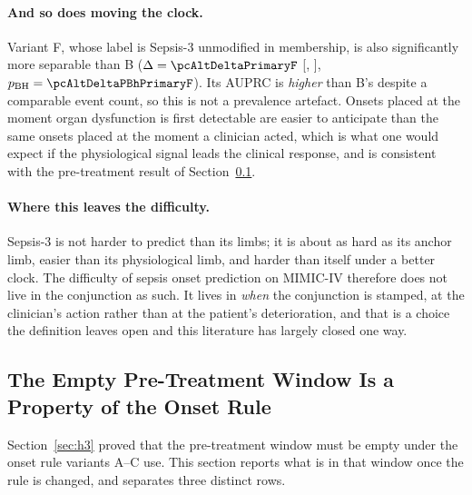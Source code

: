 \paragraph{And so does moving the clock.}
Variant F, whose label is Sepsis-3 unmodified in membership, is also
significantly more separable than B ($\Delta = \pcAltDeltaPrimaryF$
[\pcAltDeltaCiLoPrimaryF, \pcAltDeltaCiHiPrimaryF],
$p_{\text{BH}} = \pcAltDeltaPBhPrimaryF$). Its AUPRC is \emph{higher} than B's
despite a comparable event count, so this is not a prevalence artefact. Onsets
placed at the moment organ dysfunction is first detectable are easier to
anticipate than the same onsets placed at the moment a clinician acted, which
is what one would expect if the physiological signal leads the clinical
response, and is consistent with the pre-treatment result of
Section~\ref{sec:pretreatment_label}.

\paragraph{Where this leaves the difficulty.}
Sepsis-3 is not harder to predict than its limbs; it is about as hard as its
anchor limb, easier than its physiological limb, and harder than itself under a
better clock. The difficulty of sepsis onset prediction on MIMIC-IV therefore
does not live in the conjunction as such. It lives in \emph{when} the
conjunction is stamped, at the clinician's action rather than at the
patient's deterioration, and that is a choice the definition leaves open and
this literature has largely closed one way.

\subsection{The Empty Pre-Treatment Window Is a Property of the Onset Rule}
\label{sec:pretreatment_label}

Section~\ref{sec:h3} proved that the pre-treatment window must be empty under
the onset rule variants A--C use. This section reports what is in that window
once the rule is changed, and separates three distinct rows.

